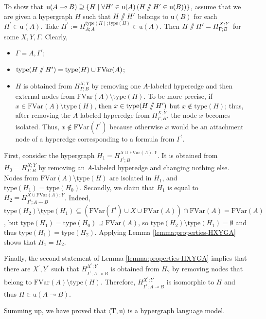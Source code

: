\documentclass[a4paper,UKenglish,cleveref, autoref, thm-restate,pdfa]{lipics-v2021}
\newcommand{\eqdef}{:=}
\newcommand{\type}{\mathrm{type}}
\newcommand{\FVar}{\mathrm{FVar}}
\newcommand{\limpl}{\multimap}
\newcommand{\pc}{\mathbin{/\mkern-6mu/}}
\begin{document}
To show that $\mathrm{u}(A \limpl B) \supseteq \{H \mid \forall H^\prime \in \mathrm{u}(A) \, (H \pc H^\prime \in \mathrm{u}(B))\}$, assume that we are given a hypergraph $H$ such that $H \pc H^\prime$ belongs to $\mathrm{u}(B)$ for each $H^\prime \in \mathrm{u}(A)$. Take $H^\prime \eqdef H^{\type(H);\type(H)}_{A;A} \in \mathrm{u}(A)$. Then $H \pc H^\prime = H^{X;Y}_{\Gamma;B}$ for some $X,Y,\Gamma$. Clearly,
\begin{itemize}
	\item $\Gamma = A, \Gamma^\prime$;
	\item $\type(H \pc H^\prime) = \type(H) \cup \FVar(A)$;
	\item $H$ is obtained from $H^{X;Y}_{\Gamma;B}$ by removing one $A$-labeled hyperedge and then external nodes from $\FVar(A) \setminus \type(H)$. To be more precise, if $x\in \FVar(A) \setminus \type(H)$, then $x \in \type(H \pc H^\prime)$ but $x \notin \type(H)$; thus, after removing the $A$-labeled hyperedge from $H^{X;Y}_{\Gamma;B}$, the node $x$ becomes isolated. Thus, $x \notin \FVar(\Gamma^\prime)$ because otherwise $x$ would be an attachment node of a hyperedge corresponding to a formula from $\Gamma^\prime$.
\end{itemize}
First, consider the hypergraph $H_1 = H^{X\cup\FVar(A);Y}_{\Gamma^\prime;B}$. It is obtained from $H_0 = H^{X;Y}_{\Gamma;B}$ by removing an $A$-labeled hyperedge and changing nothing else. Nodes from $\FVar(A) \setminus \type(H)$ are isolated in $H_1$, and $\type(H_1) = \type(H_0)$. Secondly, we claim that $H_1$ is equal to $H_2 = H^{X \cup \FVar(A);Y}_{\Gamma^\prime;A \limpl B}$. Indeed, $\type(H_2) \setminus \type(H_1) \subseteq (\FVar(\Gamma^\prime) \cup X \cup \FVar(A)) \cap \FVar(A) = \FVar(A)$, but $\type(H_1) = \type(H_0)\supseteq \FVar(A)$, so $\type(H_2) \setminus \type(H_1) = \emptyset$ and thus $\type(H_1) = \type(H_2)$. Applying Lemma \ref{lemma:properties-HXYGA} shows that $H_1=H_2$.

Finally, the second statement of Lemma \ref{lemma:properties-HXYGA} implies that there are $X^\prime,Y^\prime$ such that $H^{X^\prime;Y^\prime}_{\Gamma^\prime;A \limpl B}$ is obtained from $H_2$ by removing nodes that belong to $\FVar(A) \setminus \type(H)$. Therefore, $H^{X^\prime;Y^\prime}_{\Gamma^\prime;A \limpl B}$ is isomorphic to $H$ and thus $H \in \mathrm{u}(A \limpl B)$. 

Summing up, we have proved that $\langle \mathrm{T},\mathrm{u} \rangle$ is a hypergraph language model.
\end{document}
